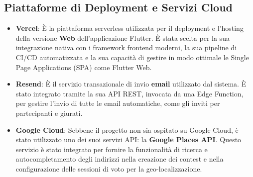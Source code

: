 \subsection{Piattaforme di Deployment e Servizi Cloud}\label{subsec:piattaforme-di-deployment-e-servizi-cloud}
\begin{itemize}
	\item \textbf{Vercel}: È la piattaforma serverless utilizzata per il deployment e l'hosting della versione \textbf{Web} dell'applicazione Flutter.
	È stata scelta per la sua integrazione nativa con i framework frontend moderni, la sua pipeline di CI/CD automatizzata e la sua capacità di gestire in modo ottimale le Single Page Applications (SPA) come Flutter Web.
	
	\item \textbf{Resend}: È il servizio transazionale di invio \textbf{email} utilizzato dal sistema.
	È stato integrato tramite la sua API REST, invocata da una Edge Function, per gestire l'invio di tutte le email automatiche, come gli inviti per partecipanti e giurati.
	
	\item \textbf{Google Cloud}: Sebbene il progetto non sia ospitato su Google Cloud, è stato utilizzato uno dei suoi servizi API: la \textbf{Google Places API}.
	Questo servizio è stato integrato per fornire la funzionalità di ricerca e autocompletamento degli indirizzi nella creazione dei contest e nella configurazione delle sessioni di voto per la geo-localizzazione.
\end{itemize}

